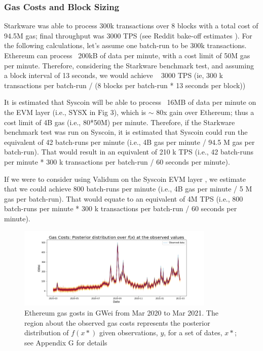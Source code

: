 \documentclass[peerreview]{ieeesyscoin}
\begin{document}
\subsubsection{Gas Costs and Block Sizing}

Starkware was able to process 300k transactions over 8 blocks with a total cost of 94.5M gas; final throughput was 3000 TPS (see Reddit bake-off estimates \cite{Sta20a}). For the following calculations, let’s assume one batch-run to be 300k transactions. Ethereum can process ~200kB of data per minute, with a cost limit of 50M gas per minute. Therefore, considering the Starkware benchmark test, and assuming a block interval of 13 seconds, we would achieve ~ 3000 TPS (ie,  300 k transactions per batch-run / (8 blocks per batch-run * 13 seconds per block))

It is estimated that Syscoin will be able to process ~16MB of data per minute on the EVM layer (i.e., SYSX in Fig 3), which is $\sim$ 80x gain over Ethereum; thus a cost limit of 4B gas (i.e., 80*50M) per minute. Therefore, if the Starkware benchmark test was run on Syscoin, it is estimated that Syscoin could run the equivalent of 42 batch-runs per minute (i.e., 4B gas per minute / 94.5 M gas per batch-run). That would result in an equivalent of 210 k TPS (i.e., 42 batch-runs per minute * 300 k transactions per batch-run / 60 seconds per minute).

If we were to consider using Validum on the Syscoin EVM layer \cite{Sta20b}, we estimate that we could achieve 800 batch-runs per minute (i.e., 4B gas per minute / 5 M gas per batch-run). That would equate to an equivalent of 4M TPS (i.e., 800 batch-runs per minute * 300 k transactions per batch-run / 60 seconds per minute).

\begin{figure}[h!]
\includegraphics[width=3.7in]{img/eth_gas_costs.png}
\caption{Ethereum gas gosts in GWei from Mar 2020 to Mar 2021. The region about the observed gas costs represents the posterior distribution of $f(x*)$ given observations, $y$, for a set of dates, $x*$; see Appendix G for details}  
\label{fig:eth_gas_costs}
\end{figure} 
\end{document}
